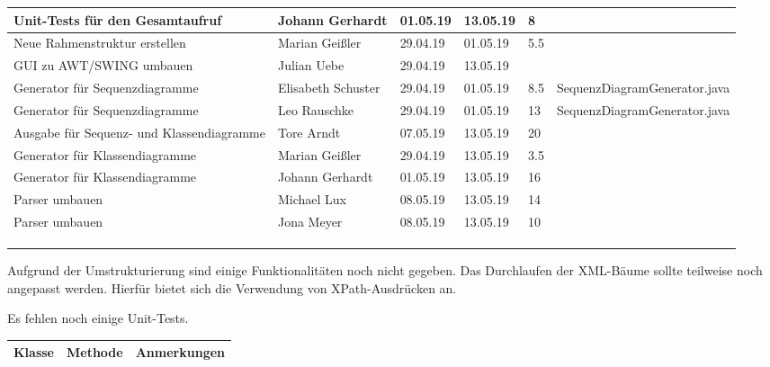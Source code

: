 \begin{longtable}{|p{4cm}|l|l|l|l|l|}
        \hline
        Unit-Tests für den Gesamtaufruf & Johann Gerhardt & 01.05.19 & 13.05.19 & 8 &\\
        \hline
        Neue Rahmenstruktur erstellen & Marian Geißler & 29.04.19 & 01.05.19 & 5.5 &\\ \hline
        GUI zu AWT/SWING umbauen & Julian Uebe & 29.04.19 & 13.05.19 &  & \\ 
		\hline
        Generator für Sequenzdiagramme & Elisabeth Schuster & 29.04.19 & 01.05.19 & 8.5 & SequenzDiagramGenerator.java\\
        \hline
        Generator für Sequenzdiagramme & Leo Rauschke & 29.04.19 & 01.05.19 & 13 & SequenzDiagramGenerator.java\\
        \hline
        Ausgabe für Sequenz- und Klassendiagramme & Tore Arndt & 07.05.19 & 13.05.19 & 20 &\\
        \hline
        Generator für Klassendiagramme & Marian Geißler & 29.04.19 & 13.05.19 & 3.5 &\\
        \hline
        Generator für Klassendiagramme & Johann Gerhardt & 01.05.19 & 13.05.19 & 16 &\\
        \hline
        Parser umbauen & Michael Lux & 08.05.19 & 13.05.19 & 14 &\\
        \hline
        Parser umbauen & Jona Meyer & 08.05.19 & 13.05.19 & 10 &\\
        \hline
        \\
        \hline
        \\
        \hline
        \\
\hline
\end{longtable}     
\nsecend

Aufgrund der Umstrukturierung sind einige Funktionalitäten noch nicht gegeben. Das Durchlaufen der XML-Bäume sollte teilweise noch angepasst werden. Hierfür bietet sich die Verwendung von XPath-Ausdrücken an.
\nsecend%

Es fehlen noch einige Unit-Tests.
\nsecend%

\begin{table}[H]

\begin{tabularx}{\textwidth}{ |l|l|X| }
\hline
\textbf{Klasse} & \textbf{Methode} & \textbf{Anmerkungen}\\
 \hline
\hline
\end{tabularx}
\end{table}

